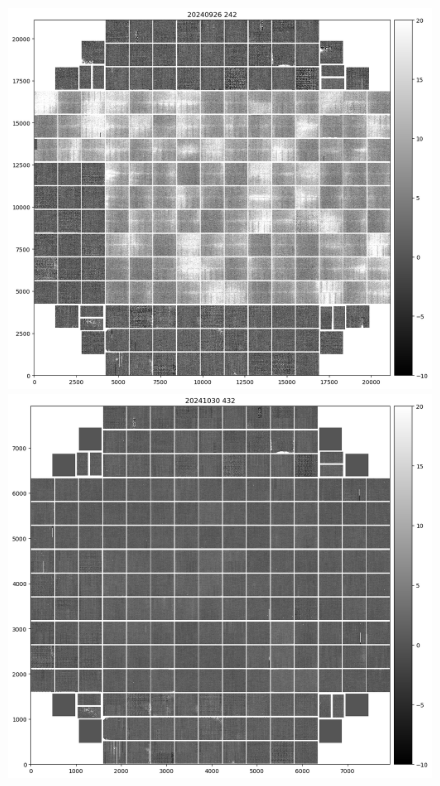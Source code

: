 \begin{figure}[ht]
\centering
\begin{minipage}[b]{0.45\textwidth}
\centering
\includegraphics[width=\textwidth]{figures/E1110dp93.png}
\end{minipage}
\hfill
\begin{minipage}[b]{0.45\textwidth}
\centering
\includegraphics[width=\textwidth]{figures/E1880dp80.png}

\end{minipage}
\end{figure}
